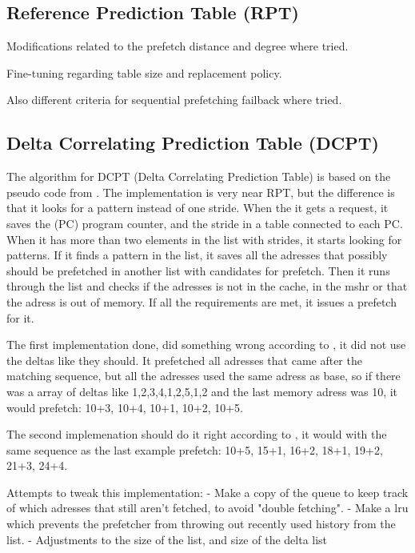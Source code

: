 \documentclass[12pt,journal,compsoc]{IEEEtran}
\begin{document}
\subsection{Reference Prediction Table (RPT)}
Modifications related to the prefetch distance and degree where tried.

Fine-tuning regarding table size and replacement policy.

Also different criteria for sequential prefetching failback where tried.


\subsection{Delta Correlating Prediction Table (DCPT)}
The algorithm for DCPT (Delta Correlating Prediction Table) is based on the pseudo code from \cite{dcptpaper}.
The implementation is very near RPT, but the difference is that it looks for a pattern instead of one stride.
When the it gets a request, it saves the (PC) program counter, and the stride in a table connected to each PC. When it has more than two elements in the list with strides, it starts looking for patterns.
If it finds a pattern in the list, it saves all the adresses that possibly should be prefetched in another list with candidates for prefetch.
Then it runs through the list and checks if the adresses is not in the cache, in the mshr or that the adress is out of memory. If all the requirements are met, it issues a prefetch for it.

The first implementation done, did something wrong according to \cite{dcptpaper}, it did not use the deltas like they should. It prefetched all adresses that came after the matching sequence, but all the adresses used the same adress as base, so if there was a array of deltas like 1,2,3,4,1,2,5,1,2 and the last memory adress was 10, it would prefetch: 10+3, 10+4, 10+1, 10+2, 10+5.

The second implemenation should do it right according to \cite{dcptpaper}, it would with the same sequence as the last example prefetch: 10+5, 15+1, 16+2, 18+1, 19+2, 21+3, 24+4.

Attempts to tweak this implementation:
- Make a copy of the queue to keep track of which adresses that still aren't fetched, to avoid "double fetching".
- Make a lru which prevents the prefetcher from throwing out recently used history from the list.
- Adjustments to the size of the list, and size of the delta list
\end{document}
